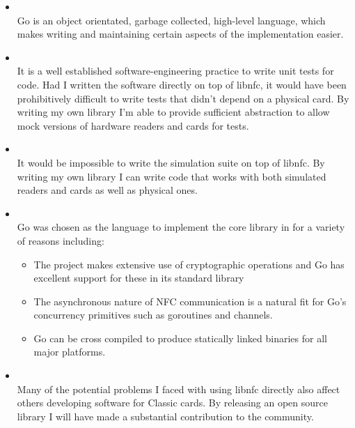 \documentclass[dissertation.tex]{subfiles}
\begin{document}
  \begin{itemize}
    \item {} \\
      Go is an object orientated, garbage collected, high-level language, which makes writing and maintaining certain aspects of the implementation easier.

    \item {} \\
      It is a well established software-engineering practice to write unit tests for code. Had I written the software directly on top of libnfc, it would have been prohibitively difficult to write tests that didn't depend on a physical card. By writing my own library I'm able to provide sufficient abstraction to allow mock versions of hardware readers and cards for tests.

    \item {} \\
      It would be impossible to write the simulation suite on top of libnfc. By writing my own library I can write code that works with both simulated readers and cards as well as physical ones.

    \item {} \\
      Go was chosen as the language to implement the core library in for a variety of reasons including:
      \begin{itemize}
        \item The project makes extensive use of cryptographic operations and Go has excellent support for these in its standard library
        \item The asynchronous nature of NFC communication is a natural fit for Go's concurrency primitives such as goroutines and channels.
        \item Go can be cross compiled to produce statically linked binaries for all major platforms.
      \end{itemize}

    \item {} \\
      Many of the potential problems I faced with using libnfc directly also affect others developing software for \mifare{} Classic cards. By releasing an open source library I will have made a substantial contribution to the community.
  \end{itemize}
\end{document}
